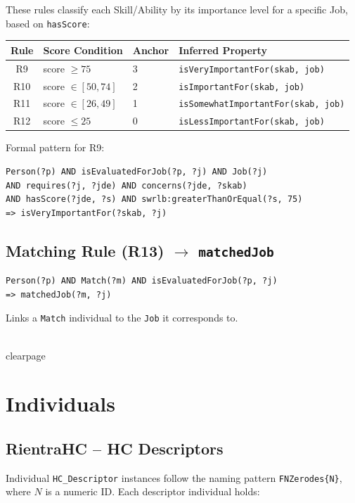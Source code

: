 ﻿\documentclass[12pt,a4paper]{article}
\begin{document}
These rules classify each Skill/Ability by its importance level for a specific Job, based on \texttt{hasScore}:

\begin{longtable}{@{}clll@{}}
\toprule
\textbf{Rule} & \textbf{Score Condition} & \textbf{Anchor} & \textbf{Inferred Property} \\
\midrule
\endhead
R9  & score $\geq 75$ & 3 & \texttt{isVeryImportantFor(skab, job)} \\
R10 & score $\in [50, 74]$ & 2 & \texttt{isImportantFor(skab, job)} \\
R11 & score $\in [26, 49]$ & 1 & \texttt{isSomewhatImportantFor(skab, job)} \\
R12 & score $\leq 25$ & 0 & \texttt{isLessImportantFor(skab, job)} \\
\bottomrule
\end{longtable}

\noindent Formal pattern for R9:
\begin{lstlisting}
Person(?p) AND isEvaluatedForJob(?p, ?j) AND Job(?j)
AND requires(?j, ?jde) AND concerns(?jde, ?skab)
AND hasScore(?jde, ?s) AND swrlb:greaterThanOrEqual(?s, 75)
=> isVeryImportantFor(?skab, ?j)
\end{lstlisting}

\subsection{Matching Rule (R13) $\rightarrow$ \texttt{matchedJob}}

\begin{lstlisting}
Person(?p) AND Match(?m) AND isEvaluatedForJob(?p, ?j)
=> matchedJob(?m, ?j)
\end{lstlisting}

Links a \texttt{Match} individual to the \texttt{Job} it corresponds to.

\\clearpage
\section{Individuals}

\subsection{RientraHC -- HC Descriptors}

Individual \texttt{HC\_Descriptor} instances follow the naming pattern \texttt{FNZerodes\{N\}}, where $N$ is a numeric ID. Each descriptor individual holds:
\end{document}
